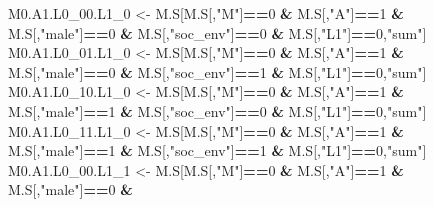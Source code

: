 \documentclass[
]{book}
\newenvironment{Shaded}{\begin{snugshade}}{\end{snugshade}}
\newcommand{\DecValTok}[1]{\textcolor[rgb]{0.00,0.00,0.81}{#1}}
\newcommand{\NormalTok}[1]{#1}
\newcommand{\OtherTok}[1]{\textcolor[rgb]{0.56,0.35,0.01}{#1}}
\newcommand{\SpecialCharTok}[1]{\textcolor[rgb]{0.81,0.36,0.00}{\textbf{#1}}}
\newcommand{\StringTok}[1]{\textcolor[rgb]{0.31,0.60,0.02}{#1}}
\begin{document}
\begin{Shaded}
\begin{Highlighting}[]
\NormalTok{  M0.A1.L0\_00.L1\_0 }\OtherTok{\textless{}{-}}\NormalTok{ M.S[M.S[,}\StringTok{"M"}\NormalTok{]}\SpecialCharTok{==}\DecValTok{0} \SpecialCharTok{\&}\NormalTok{ M.S[,}\StringTok{"A"}\NormalTok{]}\SpecialCharTok{==}\DecValTok{1} \SpecialCharTok{\&}\NormalTok{ M.S[,}\StringTok{"male"}\NormalTok{]}\SpecialCharTok{==}\DecValTok{0} \SpecialCharTok{\&} 
\NormalTok{                            M.S[,}\StringTok{"soc\_env"}\NormalTok{]}\SpecialCharTok{==}\DecValTok{0} \SpecialCharTok{\&}\NormalTok{ M.S[,}\StringTok{"L1"}\NormalTok{]}\SpecialCharTok{==}\DecValTok{0}\NormalTok{,}\StringTok{"sum"}\NormalTok{]}
\NormalTok{  M0.A1.L0\_01.L1\_0 }\OtherTok{\textless{}{-}}\NormalTok{ M.S[M.S[,}\StringTok{"M"}\NormalTok{]}\SpecialCharTok{==}\DecValTok{0} \SpecialCharTok{\&}\NormalTok{ M.S[,}\StringTok{"A"}\NormalTok{]}\SpecialCharTok{==}\DecValTok{1} \SpecialCharTok{\&}\NormalTok{ M.S[,}\StringTok{"male"}\NormalTok{]}\SpecialCharTok{==}\DecValTok{0} \SpecialCharTok{\&} 
\NormalTok{                            M.S[,}\StringTok{"soc\_env"}\NormalTok{]}\SpecialCharTok{==}\DecValTok{1} \SpecialCharTok{\&}\NormalTok{ M.S[,}\StringTok{"L1"}\NormalTok{]}\SpecialCharTok{==}\DecValTok{0}\NormalTok{,}\StringTok{"sum"}\NormalTok{]}
\NormalTok{  M0.A1.L0\_10.L1\_0 }\OtherTok{\textless{}{-}}\NormalTok{ M.S[M.S[,}\StringTok{"M"}\NormalTok{]}\SpecialCharTok{==}\DecValTok{0} \SpecialCharTok{\&}\NormalTok{ M.S[,}\StringTok{"A"}\NormalTok{]}\SpecialCharTok{==}\DecValTok{1} \SpecialCharTok{\&}\NormalTok{ M.S[,}\StringTok{"male"}\NormalTok{]}\SpecialCharTok{==}\DecValTok{1} \SpecialCharTok{\&} 
\NormalTok{                            M.S[,}\StringTok{"soc\_env"}\NormalTok{]}\SpecialCharTok{==}\DecValTok{0} \SpecialCharTok{\&}\NormalTok{ M.S[,}\StringTok{"L1"}\NormalTok{]}\SpecialCharTok{==}\DecValTok{0}\NormalTok{,}\StringTok{"sum"}\NormalTok{]}
\NormalTok{  M0.A1.L0\_11.L1\_0 }\OtherTok{\textless{}{-}}\NormalTok{ M.S[M.S[,}\StringTok{"M"}\NormalTok{]}\SpecialCharTok{==}\DecValTok{0} \SpecialCharTok{\&}\NormalTok{ M.S[,}\StringTok{"A"}\NormalTok{]}\SpecialCharTok{==}\DecValTok{1} \SpecialCharTok{\&}\NormalTok{ M.S[,}\StringTok{"male"}\NormalTok{]}\SpecialCharTok{==}\DecValTok{1} \SpecialCharTok{\&} 
\NormalTok{                            M.S[,}\StringTok{"soc\_env"}\NormalTok{]}\SpecialCharTok{==}\DecValTok{1} \SpecialCharTok{\&}\NormalTok{ M.S[,}\StringTok{"L1"}\NormalTok{]}\SpecialCharTok{==}\DecValTok{0}\NormalTok{,}\StringTok{"sum"}\NormalTok{]}
\NormalTok{  M0.A1.L0\_00.L1\_1 }\OtherTok{\textless{}{-}}\NormalTok{ M.S[M.S[,}\StringTok{"M"}\NormalTok{]}\SpecialCharTok{==}\DecValTok{0} \SpecialCharTok{\&}\NormalTok{ M.S[,}\StringTok{"A"}\NormalTok{]}\SpecialCharTok{==}\DecValTok{1} \SpecialCharTok{\&}\NormalTok{ M.S[,}\StringTok{"male"}\NormalTok{]}\SpecialCharTok{==}\DecValTok{0} \SpecialCharTok{\&} 

\end{Highlighting}
\end{Shaded}
\end{document}

